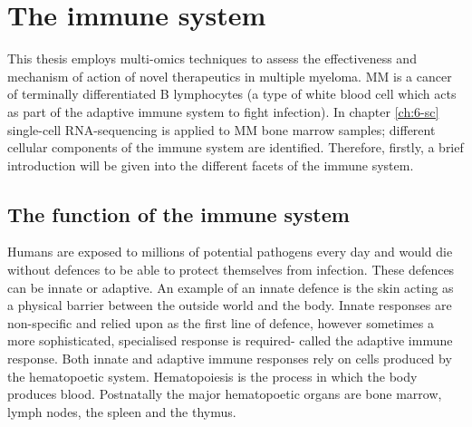 \section{The immune system}
This thesis employs multi-omics techniques to assess the effectiveness and mechanism of action of novel therapeutics in multiple myeloma.
MM is a cancer of terminally differentiated B lymphocytes (a type of white blood cell which acts as part of the adaptive immune system to fight infection).
In chapter \ref{ch:6-sc} single-cell RNA-sequencing is applied to MM bone marrow samples;
different cellular components of the immune system are identified.
Therefore, firstly, a brief introduction will be given into the different facets of the immune system.

\subsection{The function of the immune system}
Humans are exposed to millions of potential pathogens every day and would die without defences to be able to protect themselves from infection.
These defences can be innate or adaptive.
An example of an innate defence is the skin acting as a physical barrier between the outside world and the body.
Innate responses are non-specific and relied upon as the first line of defence, however sometimes a more sophisticated, specialised response is required- called the adaptive immune response\cite{alberts2007molecularimmune}.
Both innate and adaptive immune responses rely on cells produced by the hematopoetic system.
Hematopoiesis is the process in which the body produces blood\cite{alberts2007molecularstem}.
Postnatally the major hematopoetic organs are bone marrow, lymph nodes, the spleen and the thymus.

